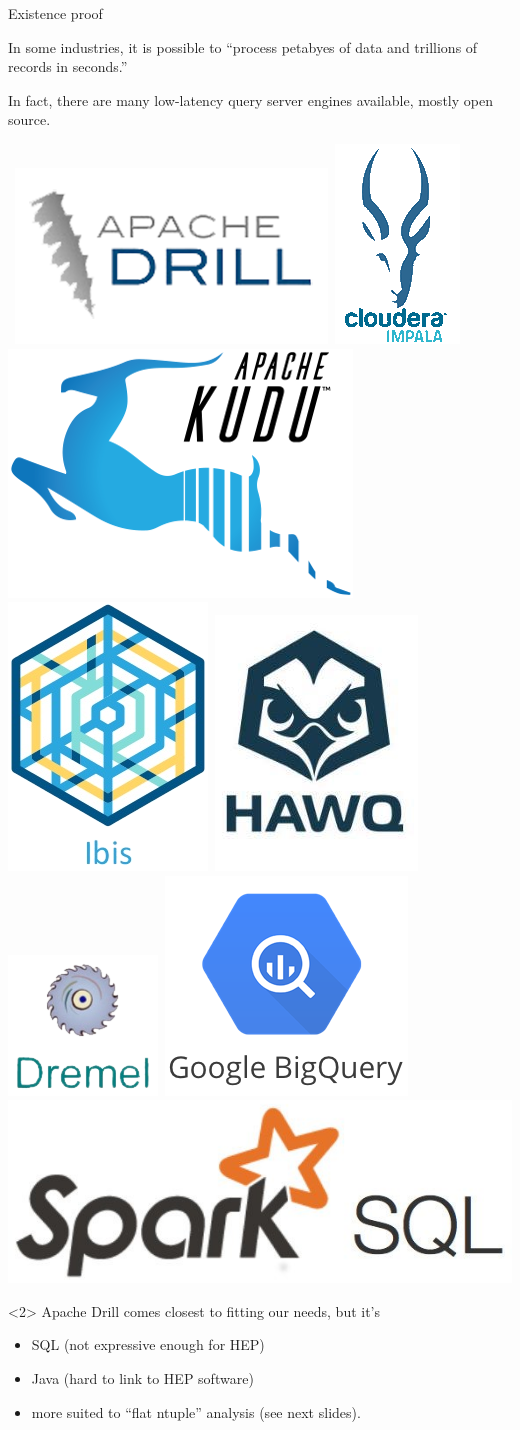 \documentclass{beamer}
\begin{document}
\begin{frame}{Existence proof}

In some industries, it is possible to ``process petabyes of data and trillions of records in seconds\footnotemark[1].''

\vspace{0.2 cm}
In fact, there are many low-latency query server engines available, mostly open source.

\vspace{0.5 cm}
\mbox{\hspace{-1 cm}
\includegraphics[height=1.23 cm]{drill-logo.png}
\includegraphics[height=1.23 cm]{impala-logo.png}
\includegraphics[height=1.23 cm]{kudu-logo.png}
\includegraphics[height=1.23 cm]{ibis-logo.png}
\includegraphics[height=1.23 cm]{hawk-logo.png}
\includegraphics[height=1.23 cm]{dremel-logo.png}
\includegraphics[height=1.23 cm]{bigquery-logo.png}
\includegraphics[height=1.23 cm]{sparksql-logo.png}}

\vspace{0.5 cm}
\begin{uncoverenv}<2>
Apache Drill comes closest to fitting our needs, but it's
\begin{itemize}
\item SQL (not expressive enough for HEP)
\item Java (hard to link to HEP software)
\item more suited to ``flat ntuple'' analysis (see next slides).
\end{itemize}
\end{uncoverenv}

\end{frame}
\end{document}
